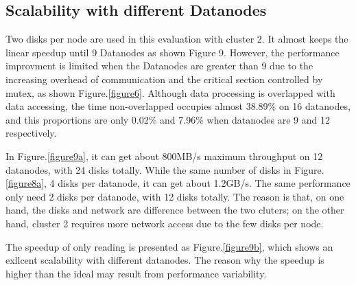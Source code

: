 \documentclass[preprint,12pt]{elsarticle}
\begin{document}
\subsection{Scalability with different Datanodes}
Two disks per node are used in this evaluation with cluster 2. It almost keeps the linear speedup until 9 Datanodes as shown Figure 9. 
However, the performance improvment is limited when the Datanodes are greater than 9 due to the increasing overhead of communication
and the critical section controlled by mutex, as shown Figure.\ref{figure6}. Although data processing is overlapped with data accessing, 
the time non-overlapped occupies almost 38.89\% on 16 datanodes, and this proportions are only 0.02\% and 7.96\% when datanodes are 9 
and 12 respectively. \par
In Figure.\ref{figure9a}, it can get about 800MB/s maximum throughput on 12 datanodes, with 24 disks totally. While the same number of 
disks in Figure.\ref{figure8a}, 4 disks per datanode, it can get about 1.2GB/s. The same performance only need 2 disks per datanode, 
with 12 disks totally. The reason is that, on one hand, the disks and network are difference between the two cluters; on the other hand,
cluster 2 requires more network access due to the few disks per node.  \par
The speedup of only reading is presented as Figure.\ref{figure9b}, which shows an exllcent scalability with different datanodes. The 
reason why the speedup is higher than the ideal may result from performance variability. 
\end{document}
